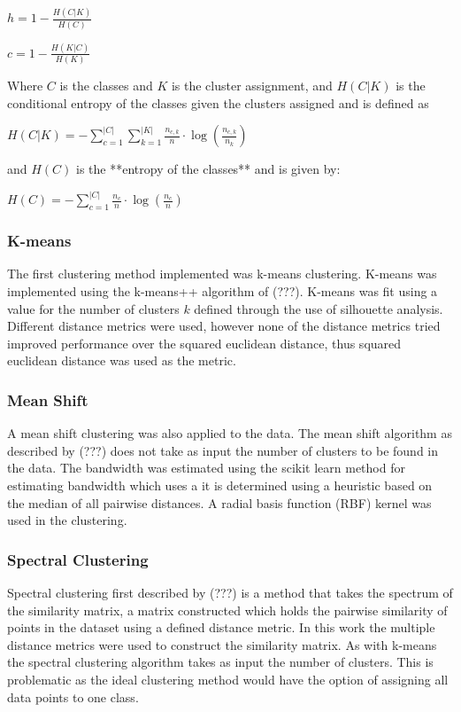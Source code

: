 \documentclass[journal, a4paper]{IEEEtran}
\begin{document}
$h = 1 - \frac{H(C|K)}{H(C)}$

$c = 1 - \frac{H(K|C)}{H(K)}$

Where $C$ is the classes and $K$ is the cluster assignment, and $H(C|K)$ is the conditional entropy of the classes given the clusters assigned and is defined as

$ H(C|K) = - \sum_{c=1}^{|C|} \sum_{k=1}^{|K|} \frac{n_{c,k}}{n}
          \cdot \log\left(\frac{n_{c,k}}{n_k}\right)$

and $H(C)$ is the **entropy of the classes** and is given by:

$H(C) = - \sum_{c=1}^{|C|} \frac{n_c}{n} \cdot \log\left(\frac{n_c}{n}\right)$

\subsubsection{K-means}

The first clustering method implemented was k-means clustering. K-means was implemented using the k-means++ algorithm of (???). K-means was fit using a value for the number of clusters $k$ defined through the use of silhouette analysis. Different distance metrics were used, however none of the distance metrics tried improved performance over the squared euclidean distance, thus squared euclidean distance was used as the metric.

\subsubsection{Mean Shift}

A mean shift clustering was also applied to the data. The mean shift algorithm as described by (???) does not take as input the number of clusters to be found in the data. The bandwidth was estimated using the scikit learn method for estimating bandwidth which uses a it is determined using a heuristic based on the median of all pairwise distances. A radial basis function (RBF) kernel was used in the clustering.

\subsubsection{Spectral Clustering}

Spectral clustering first described by (???) is a method that takes the spectrum of the similarity matrix, a matrix constructed which holds the pairwise similarity of points in the dataset using a defined distance metric. In this work the multiple distance metrics were used to construct the similarity matrix. As with k-means the spectral clustering algorithm takes as input the number of clusters. This is problematic as the ideal clustering method would have the option of assigning all data points to one class.
\end{document}
